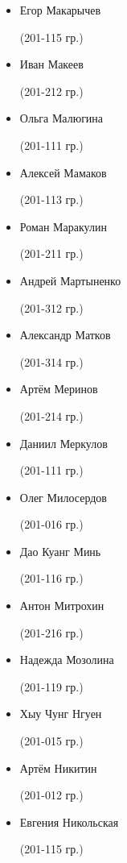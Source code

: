 \begin{multicols}{2}
\begin{small}
\begin{itemize}[leftmargin=*]
	\item[] Егор Макарычев\begin{tiny} (201-115 гр.)\end{tiny}
	\item[] Иван Макеев\begin{tiny} (201-212 гр.)\end{tiny} %
	\item[] Ольга Малюгина\begin{tiny} (201-111 гр.)\end{tiny}
	\item[] Алексей Мамаков\begin{tiny} (201-113 гр.)\end{tiny} %
	\item[] Роман Маракулин\begin{tiny} (201-211 гр.)\end{tiny}
	\item[] Андрей Мартыненко\begin{tiny} (201-312 гр.)\end{tiny}
	\item[] Александр Матков\begin{tiny} (201-314 гр.)\end{tiny} %
	\item[] Артём Меринов\begin{tiny} (201-214 гр.)\end{tiny}
	\item[] Даниил Меркулов\begin{tiny} (201-111 гр.)\end{tiny}
	\item[] Олег Милосердов\begin{tiny} (201-016 гр.)\end{tiny}
	\item[] Дао Куанг Минь\begin{tiny} (201-116 гр.)\end{tiny}
	\item[] Антон Митрохин\begin{tiny} (201-216 гр.)\end{tiny} %
	\item[] Надежда Мозолина\begin{tiny} (201-119 гр.)\end{tiny}

	\item[] Хыу Чунг Нгуен\begin{tiny} (201-015 гр.)\end{tiny} %
	\item[] Артём Никитин\begin{tiny} (201-012 гр.)\end{tiny}
	\item[] Евгения Никольская\begin{tiny} (201-115 гр.)\end{tiny} %


\end{itemize}
\end{small}
\end{multicols}
